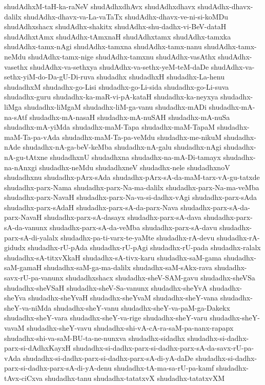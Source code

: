 {shudAdhxM-taH-ka-raNeV
shudAdhxdhAvx
shudAdhxdhavx
shudAdhx-dhavx-dalilx
shudAdhx-dhavx-va-La-vaTaTx
shudAdhx-dhavx-ve-ni-si-koMDu
shudAdhxshacx
shudAdhx-shakitx
shudAdhx-shu-dadhx-vi-BeV-dataH
shudAdhxtAmx
shudAdhx-tAmxnaH
shudAdhxtamx
shudAdhx-tamxka
shudAdhx-tamx-nAgi
shudAdhx-tamxna
shudAdhx-tamx-nanu
shudAdhx-tamx-neMdu
shudAdhx-tamx-nige
shudAdhx-tamxnu
shudAdhx-vasAthx
shudAdhx-vasethx
shudAdhx-va-sethxya
shudAdhx-va-sethx-yeM-teM-daDe
shudAdhx-va-sethx-yiM-do-Da-gU-Di-ruva
shudadhx
shudadhxH
shudadhx-La-henu
shudadhxM
shudadhx-go-Lisi
shudadhx-go-Li-sida
shudadhx-go-Li-suva
shudadhx-guru
shudadhx-ka-maR-vi-pA-kataH
shudadhx-ka-neyxya
shudadhx-liMga
shudadhx-liMgaM
shudadhx-liM-ga-vanu
shudadhx-mADi
shudadhx-mA-na-sAtf
shudadhx-mA-nasaH
shudadhx-mA-nuSAH
shudadhx-mA-nuSa
shudadhx-mA-yiMda
shudadhx-maM-Tapa
shudadhx-maM-TapaM
shudadhx-maM-Ta-pa-vAda
shudadhx-maM-Ta-pa-veMdu
shudadhx-me-nikuM
shudadhx-nAde
shudadhx-nA-ga-beV-keMba
shudadhx-nA-galu
shudadhx-nAgi
shudadhx-nA-gu-tAtxne
shudadhxnU
shudadhxna
shudadhx-na-mA-Di-tamayx
shudadhx-na-nAnxgi
shudadhx-neMdu
shudadhxneV
shudadhx-nele
shudadhxnoV
shudadhxnu
shudadhx-pArx-sAda
shudadhx-pArx-sA-da-maM-tarx-vA-gu-tatxde
shudadhx-parx-Nama
shudadhx-parx-Na-ma-dalilx
shudadhx-parx-Na-ma-veMba
shudadhx-parx-NavaH
shudadhx-parx-Na-va-si-dadhx-vAgi
shudadhx-parx-sAda
shudadhx-parx-sAdaH
shudadhx-parx-sA-da-parx-Nava
shudadhx-parx-sA-da-parx-NavaH
shudadhx-parx-sA-dasayx
shudadhx-parx-sA-dava
shudadhx-parx-sA-da-vanunx
shudadhx-parx-sA-da-veMba
shudadhx-parx-sA-davu
shudadhx-parx-sA-di-yalalx
shudadhx-pa-ti-varx-te-yaMte
shudadhx-rA-devu
shudadhx-rA-gidudx
shudadhx-rU-pAda
shudadhx-rU-pAgi
shudadhx-rU-pada
shudadhx-ralalx
shudadhx-sA-titxvXkaH
shudadhx-sA-tivx-karu
shudadhx-saM-gama
shudadhx-saM-gamaH
shudadhx-saM-ga-ma-dalilx
shudadhx-saM-sAkx-rava
shudadhx-savx-rU-pa-vanunx
shudadhxshacx
shudadhx-sheV-SAM-gavu
shudadhx-sheVSa
shudadhx-sheVSaH
shudadhx-sheV-Sa-vanunx
shudadhx-sheYvA
shudadhx-sheYva
shudadhx-sheYvaH
shudadhx-sheYvaM
shudadhx-sheY-vana
shudadhx-sheY-va-niMda
shudadhx-sheY-vanu
shudadhx-sheY-va-paM-ga-Dakekx
shudadhx-sheY-vara
shudadhx-sheY-va-rige
shudadhx-sheY-varu
shudadhx-sheY-vavaM
shudadhx-sheY-vavu
shudadhx-shi-vA-cA-ra-saM-pa-nanx-rapapx
shudadhx-shi-va-saM-BU-ta-ne-nunxva
shudadhx-sidadhx
shudadhx-si-dadhx-parx-si-dAdhxKayxH
shudadhx-si-dadhx-parx-si-dadhx-parx-sA-da-savx-rU-pa-vAda
shudadhx-si-dadhx-parx-si-dadhx-parx-sA-di-yA-daDe
shudadhx-si-dadhx-parx-si-dadhx-parx-sA-di-yA-denu
shudadhx-tA-ma-sa-rU-pa-kamf
shudadhx-tAvx-ciCxva
shudadhx-tanu
shudadhx-tatatxvX
shudadhx-tatatxvXM
}
